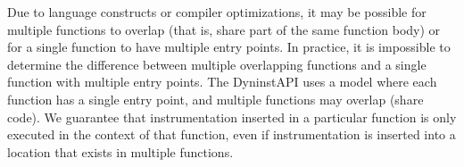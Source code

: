 Due to language constructs or compiler optimizations, it may be possible for
multiple functions to overlap (that is, share part of the same function body) or
for a single function to have multiple entry points. In practice, it is
impossible to determine the difference between multiple overlapping functions
and a single function with multiple entry points. The DyninstAPI uses a model
where each function has a single entry point, and multiple functions may overlap
(share code). We guarantee that instrumentation inserted in a particular function
is only executed in the context of that function, even if instrumentation is
inserted into a location that exists in multiple functions.
